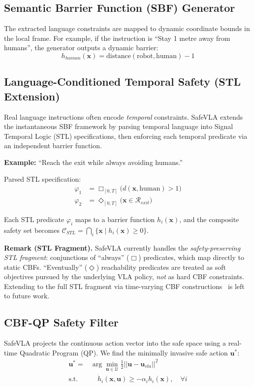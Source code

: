 \documentclass[conference]{IEEEtran}
\begin{document}
\subsection{Semantic Barrier Function (SBF) Generator}
The extracted language constraints are mapped to dynamic coordinate bounds in the local frame. For example, if the instruction is ``Stay 1 metre away from humans'', the generator outputs a dynamic barrier:
\begin{equation}
h_{human}(\mathbf{x}) = \text{distance}(\text{robot}, \text{human}) - 1
\end{equation}

\subsection{Language-Conditioned Temporal Safety (STL Extension)}
Real language instructions often encode \textit{temporal} constraints. SafeVLA extends the instantaneous SBF framework by parsing temporal language into Signal Temporal Logic (STL) specifications, then enforcing each temporal predicate via an independent barrier function.

\noindent\textbf{Example:} ``Reach the exit while always avoiding humans.''

\noindent Parsed STL specification:
\begin{align}
\varphi_1 &= \Box_{[0,T]} \big( d(\mathbf{x}, \text{human}) > 1 \big) \label{eq:stl_always} \\
\varphi_2 &= \Diamond_{[0,T]} \big( \mathbf{x} \in \mathcal{R}_{exit} \big) \label{eq:stl_eventually}
\end{align}

Each STL predicate $\varphi_i$ maps to a barrier function $h_i(\mathbf{x})$, and the composite safety set becomes $\mathcal{C}_{STL} = \bigcap_i \{ \mathbf{x} \mid h_i(\mathbf{x}) \ge 0 \}$.

\noindent\textbf{Remark (STL Fragment).} SafeVLA currently handles the \textit{safety-preserving STL fragment}: conjunctions of ``always'' ($\Box$) predicates, which map directly to static CBFs. ``Eventually'' ($\Diamond$) reachability predicates are treated as soft objectives pursued by the underlying VLA policy, \textit{not} as hard CBF constraints. Extending to the full STL fragment via time-varying CBF constructions~\cite{lindemann2019cbf_stl_csl, liang2023erg_cbf_stl, chen2025stl_cbf_tac} is left to future work.

\subsection{CBF-QP Safety Filter}
SafeVLA projects the continuous action vector into the safe space using a real-time Quadratic Program (QP). We find the minimally invasive safe action $\mathbf{u}^*$:
\begin{align}
    \mathbf{u}^* =& \arg \min_{\mathbf{u} \in \mathcal{U}} \frac{1}{2} || \mathbf{u} - \mathbf{u}_{vla} ||^2 \\
    \text{s.t.}& \quad \dot{h}_i(\mathbf{x}, \mathbf{u}) \ge -\alpha_i h_i(\mathbf{x}), \quad \forall i
\end{align}
\end{document}
